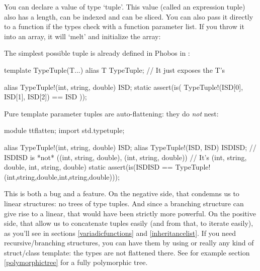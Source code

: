 You can declare a value of type `tuple'. This value (called an expression tuple) also has a length, can be indexed and can be sliced. You can also pass it directly to a function if the types check with a function parameter list. If you throw it into an array, it will `melt' and initialize the array:


The simplest possible tuple is already defined in Phobos in :

\begin{dcode}
template TypeTuple(T...)
{
   alias T TypeTuple; // It just exposes the T's
}

alias TypeTuple!(int, string, double) ISD;
static assert(is( TypeTuple!(ISD[0], ISD[1], ISD[2]) == ISD ));
\end{dcode}

Pure template parameter tuples are auto-flattening: they do \emph{not} nest:

\begin{dcode}
module ttflatten;
import std.typetuple;

alias TypeTuple!(int, string, double) ISD;
alias TypeTuple!(ISD, ISD) ISDISD; 
// ISDISD is *not* ((int, string, double), (int, string, double))
// It's (int, string, double, int, string, double)
static assert(is(ISDISD == TypeTuple!(int,string,double,int,string,double)));
\end{dcode}

This is both a bug and a feature. On the negative side, that condemns us to linear structures: no trees of type tuples. And since a branching structure can give rise to a linear, that would have been strictly more powerful. On the positive side, that allow us to concatenate tuples easily (and from that, to iterate easily), as you'll see in sections \ref{variadicfunctions} and \ref{inheritancelist}. If you need recursive/branching structures, you can have them by using  or really any kind of struct/class template: the types are not flattened there. See for example section \ref{polymorphictree} for a fully polymorphic tree.

